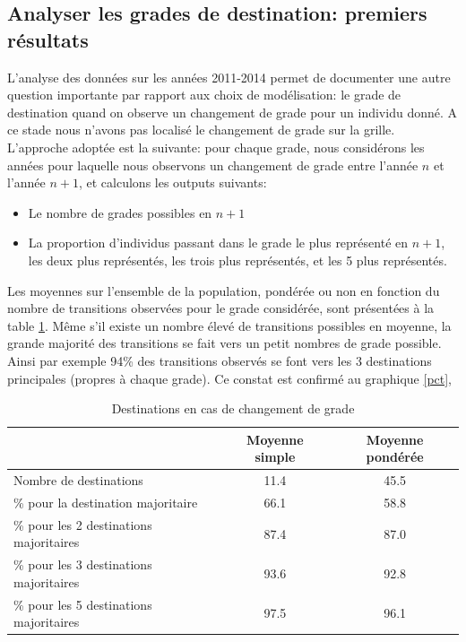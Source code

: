 \documentclass[11pt,a4paper]{article}
\begin{document}
\subsection{Analyser les grades de destination: premiers résultats}

L'analyse des données sur les années 2011-2014 permet de documenter une autre question importante par rapport aux choix de modélisation: le grade de destination quand on observe un changement de grade pour un individu donné. A ce stade nous n'avons pas localisé le changement de grade sur la grille. L'approche adoptée est la suivante: pour chaque grade, nous considérons les années pour laquelle nous observons un changement de grade entre l'année $n$ et l'année $n+1$, et calculons les outputs suivants: 


\begin{itemize}[leftmargin=1cm ,parsep=0cm,itemsep=0cm,topsep=0cm] 
\item Le nombre de grades possibles en $n+1$
\item La proportion d'individus passant dans le grade le plus représenté en $n+1$, les deux plus représentés, les trois plus représentés, et les 5 plus représentés. 
\end{itemize}

Les moyennes sur l'ensemble de la population, pondérée ou non en fonction du nombre de transitions observées pour le grade considérée, sont présentées à la table \ref{means}. Même s'il existe un nombre élevé de transitions possibles en moyenne, la grande majorité des transitions se fait vers un petit nombres de grade possible. Ainsi par exemple 94\% des transitions observés se font vers les 3 destinations principales (propres à chaque grade). Ce constat est confirmé au graphique \ref{pct},

\begin{table}[ht]
\label{means}
\centering
\caption{Destinations en cas de changement de grade} 
\begin{tabular}{l|cc}
  \hline
 & Moyenne simple & Moyenne pondérée \\ 
  \hline
Nombre de destinations & 11.4 & 45.5 \\ 
  \% pour la destination majoritaire & 66.1 & 58.8 \\ 
  \% pour les 2 destinations majoritaires & 87.4 & 87.0 \\ 
  \% pour les 3 destinations majoritaires & 93.6 & 92.8 \\ 
  \% pour les 5 destinations majoritaires & 97.5 & 96.1 \\ 
   \hline
\end{tabular}
\end{table}
\end{document}
